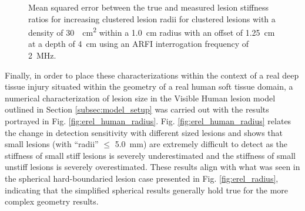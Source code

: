 			\begin{figure}[!htb]
				\centering
				\caption[Shear-wave speed quantified mean squared error related to small lesion cluster density]{Mean squared error between the true and measured lesion stiffness ratios for increasing clustered lesion radii for clustered lesions with a density of \SI{30}{\per\cm\squared} within a \SI{1.0}{cm} radius with an offset of \SI{1.25}{\cm} at a depth of \SI{4}{\cm} using an ARFI interrogation frequency of \SI{2}{\MHz}.}
				\label{fig:erel_cluster_radius_mse}
			\end{figure}

			Finally, in order to place these characterizations within the context of a real deep tissue injury situated within the geometry of a real human soft tissue domain, a numerical characterization of lesion size in the Visible Human lesion model outlined in Section \ref{subsec:model_setup} was carried out with the results portrayed in Fig. \ref{fig:erel_human_radius}. Fig. \ref{fig:erel_human_radius} relates the change in detection sensitivity with different sized lesions and shows that small lesions (with ``radii'' $\leq$ \SI{5.0}{\mm}) are extremely difficult to detect as the stiffness of small stiff lesions is severely underestimated and the stiffness of small unstiff lesions is severely overestimated. These results align with what was seen in the spherical hard-boundaried lesion case presented in Fig. \ref{fig:erel_radius}, indicating that the simplified spherical results generally hold true for the more complex geometry results.

